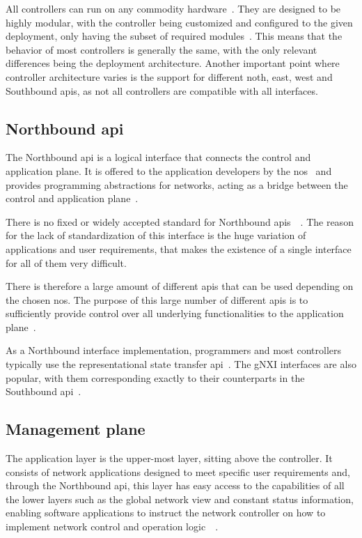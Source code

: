 All controllers can run on any commodity hardware~\cite{kreutz_software-defined_2015}. They are designed to be highly modular, with the controller being customized and configured to the given deployment, only having the subset of required modules~\cite{peterson_software-defined_2021}. This means that the behavior of most controllers is generally the same, with the only relevant differences being the deployment architecture. Another important point where controller architecture varies is the support for different noth, east, west and Southbound \glspl{api}, as not all controllers are compatible with all interfaces. 

\subsection[Northbound API]{Northbound \gls{api}} %
The Northbound \gls{api} is a logical interface that connects the control and application plane. It is offered to the application developers by the \gls{nos}~\cite{kreutz_software-defined_2015} and provides programming abstractions for networks, acting as a bridge between the control and application plane~\cite{latif_comprehensive_2020}.

There is no fixed or widely accepted standard for Northbound \glspl{api}~\cite{kreutz_software-defined_2015}~\cite{latif_comprehensive_2020}. The reason for the lack of standardization of this interface is the huge variation of applications and user requirements, that makes the existence of a single interface for all of them very difficult.

There is therefore a large amount of different \glspl{api} that can be used depending on the chosen \gls{nos}. The purpose of this large number of different \glspl{api} is to sufficiently provide control over all underlying functionalities to the application plane~\cite{peterson_software-defined_2021}.

As a Northbound interface implementation, programmers and most controllers typically use the representational state transfer \gls{api}~\cite{latif_comprehensive_2020}. The gNXI interfaces are also popular, with them corresponding exactly to their counterparts in the Southbound \gls{api}~\cite{peterson_software-defined_2021}. 
        

\subsection{Management plane} %
The application layer is the upper-most layer, sitting above the controller. It consists of network applications designed to meet specific user requirements and, through the Northbound \gls{api}, this layer has easy access to the capabilities of all the lower layers such as the global network view and constant status information, enabling software applications to instruct the network controller on how to implement network control and operation logic~\cite{xia_survey_2015}~\cite{liatifis_advancing_2023}. 

